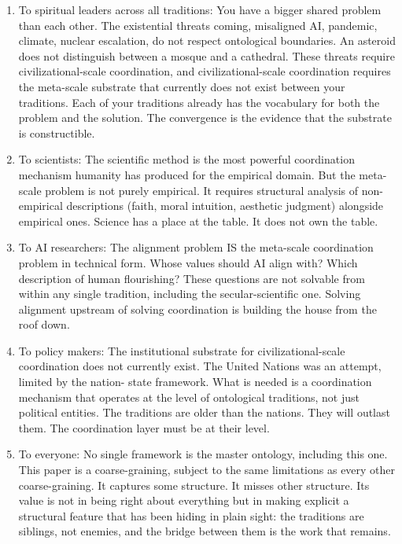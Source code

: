 \documentclass[
]{article}
\begin{document}
\begin{enumerate}
\def\labelenumi{\arabic{enumi}.}
\setcounter{enumi}{246}
\item
  To spiritual leaders across all traditions: You have a bigger shared
  problem than each other. The existential threats coming, misaligned
  AI, pandemic, climate, nuclear escalation, do not respect ontological
  boundaries. An asteroid does not distinguish between a mosque and a
  cathedral. These threats require civilizational-scale coordination,
  and civilizational-scale coordination requires the meta-scale
  substrate that currently does not exist between your traditions. Each
  of your traditions already has the vocabulary for both the problem and
  the solution. The convergence is the evidence that the substrate is
  constructible.
\item
  To scientists: The scientific method is the most powerful coordination
  mechanism humanity has produced for the empirical domain. But the
  meta-scale problem is not purely empirical. It requires structural
  analysis of non-empirical descriptions (faith, moral intuition,
  aesthetic judgment) alongside empirical ones. Science has a place at
  the table. It does not own the table.
\item
  To AI researchers: The alignment problem IS the meta-scale
  coordination problem in technical form. Whose values should AI align
  with? Which description of human flourishing? These questions are not
  solvable from within any single tradition, including the
  secular-scientific one. Solving alignment upstream of solving
  coordination is building the house from the roof down.
\item
  To policy makers: The institutional substrate for civilizational-scale
  coordination does not currently exist. The United Nations was an
  attempt, limited by the nation- state framework. What is needed is a
  coordination mechanism that operates at the level of ontological
  traditions, not just political entities. The traditions are older than
  the nations. They will outlast them. The coordination layer must be at
  their level.
\item
  To everyone: No single framework is the master ontology, including
  this one. This paper is a coarse-graining, subject to the same
  limitations as every other coarse-graining. It captures some
  structure. It misses other structure. Its value is not in being right
  about everything but in making explicit a structural feature that has
  been hiding in plain sight: the traditions are siblings, not enemies,
  and the bridge between them is the work that remains.
\end{enumerate}
\end{document}
